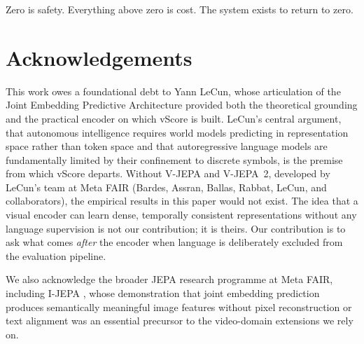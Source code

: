 \documentclass[11pt]{article}
\begin{document}
Zero is safety. Everything above zero is cost. The system exists to return to zero.

\section*{Acknowledgements}

This work owes a foundational debt to Yann LeCun, whose articulation of the Joint Embedding Predictive Architecture \citep{lecun2022} provided both the theoretical grounding and the practical encoder on which vScore is built. LeCun's central argument, that autonomous intelligence requires world models predicting in representation space rather than token space and that autoregressive language models are fundamentally limited by their confinement to discrete symbols, is the premise from which vScore departs. Without V-JEPA and V-JEPA~2, developed by LeCun's team at Meta FAIR (Bardes, Assran, Ballas, Rabbat, LeCun, and collaborators), the empirical results in this paper would not exist. The idea that a visual encoder can learn dense, temporally consistent representations without any language supervision is not our contribution; it is theirs. Our contribution is to ask what comes \emph{after} the encoder when language is deliberately excluded from the evaluation pipeline.

We also acknowledge the broader JEPA research programme at Meta FAIR, including I-JEPA \citep{assran2023}, whose demonstration that joint embedding prediction produces semantically meaningful image features without pixel reconstruction or text alignment was an essential precursor to the video-domain extensions we rely on.


\end{document}
